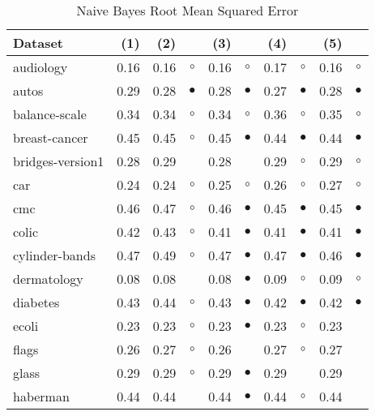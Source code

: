 \begin{table}[htb]
\caption{\label{nbrmse}Naive Bayes Root Mean Squared Error}
\footnotesize
{\centering \begin{tabular}{lrr@{\hspace{0.1cm}}cr@{\hspace{0.1cm}}cr@{\hspace{0.1cm}}cr@{\hspace{0.1cm}}c}
\\
\hline
Dataset & (1)& (2) & & (3) & & (4) & & (5) & \\
\hline
audiology & 0.16 & 0.16 &   $\circ$ & 0.16 &   $\circ$ & 0.17 &   $\circ$ & 0.16 &    $\circ$\\
autos & 0.29 & 0.28 & $\bullet$ & 0.28 & $\bullet$ & 0.27 & $\bullet$ & 0.28 &  $\bullet$\\
balance-scale & 0.34 & 0.34 &   $\circ$ & 0.34 &   $\circ$ & 0.36 &   $\circ$ & 0.35 &    $\circ$\\
breast-cancer & 0.45 & 0.45 &   $\circ$ & 0.45 & $\bullet$ & 0.44 & $\bullet$ & 0.44 &  $\bullet$\\
bridges-version1 & 0.28 & 0.29 &           & 0.28 &           & 0.29 &   $\circ$ & 0.29 &    $\circ$\\
car & 0.24 & 0.24 &   $\circ$ & 0.25 &   $\circ$ & 0.26 &   $\circ$ & 0.27 &    $\circ$\\
cmc & 0.46 & 0.47 &   $\circ$ & 0.46 & $\bullet$ & 0.45 & $\bullet$ & 0.45 &  $\bullet$\\
colic & 0.42 & 0.43 &   $\circ$ & 0.41 & $\bullet$ & 0.41 & $\bullet$ & 0.41 &  $\bullet$\\
cylinder-bands & 0.47 & 0.49 &   $\circ$ & 0.47 & $\bullet$ & 0.47 & $\bullet$ & 0.46 &  $\bullet$\\
dermatology & 0.08 & 0.08 &           & 0.08 & $\bullet$ & 0.09 &   $\circ$ & 0.09 &    $\circ$\\
diabetes & 0.43 & 0.44 &   $\circ$ & 0.43 & $\bullet$ & 0.42 & $\bullet$ & 0.42 &  $\bullet$\\
ecoli & 0.23 & 0.23 &   $\circ$ & 0.23 & $\bullet$ & 0.23 &   $\circ$ & 0.23 &           \\
flags & 0.26 & 0.27 &   $\circ$ & 0.26 &           & 0.27 &   $\circ$ & 0.27 &           \\
glass & 0.29 & 0.29 &   $\circ$ & 0.29 & $\bullet$ & 0.29 &           & 0.29 &           \\
haberman & 0.44 & 0.44 &           & 0.44 & $\bullet$ & 0.44 &   $\circ$ & 0.44 &           \\

\end{tabular}}
\end{table}
